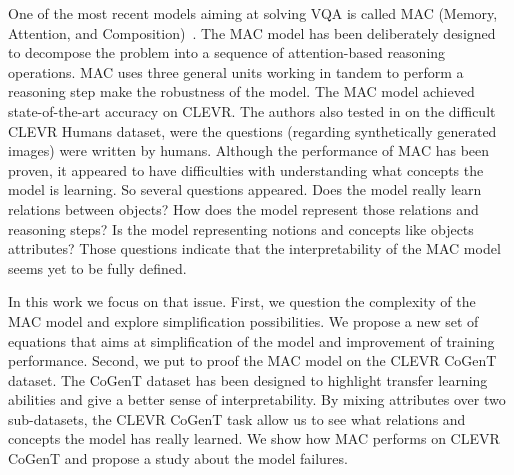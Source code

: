One of the most recent models aiming at solving VQA is called MAC (Memory, Attention, and Composition)~\citep{hudson2018compositional}. The MAC model has been deliberately designed to decompose the problem into a sequence of attention-based reasoning operations. 
MAC uses three general units working in tandem to perform a reasoning step make the robustness of the model.
The MAC  model achieved state-of-the-art accuracy on CLEVR.
The authors also tested in on the difficult CLEVR Humans dataset, were the questions (regarding synthetically generated images) were written by humans. 
Although the performance of MAC has been proven, it appeared to have difficulties with understanding what concepts the model is learning. 
So several questions appeared.
Does the model really learn relations between objects? 
How does the model represent those relations and reasoning steps? 
Is the model representing notions and concepts like objects attributes?
Those questions indicate that the interpretability of the MAC model seems yet to be fully defined.

In this work we focus on that issue.
First, we question the complexity of the MAC model and explore simplification possibilities. We propose a new set of equations that aims at simplification of the model and improvement of training performance. 
Second, we put to proof the MAC model on the CLEVR CoGenT dataset. The CoGenT dataset has been designed to highlight transfer learning abilities and give a better sense of interpretability. By mixing attributes over two sub-datasets, the CLEVR CoGenT task allow us to see what relations and concepts the model has really learned. We show how MAC performs on CLEVR CoGenT and propose a study about the model failures.
